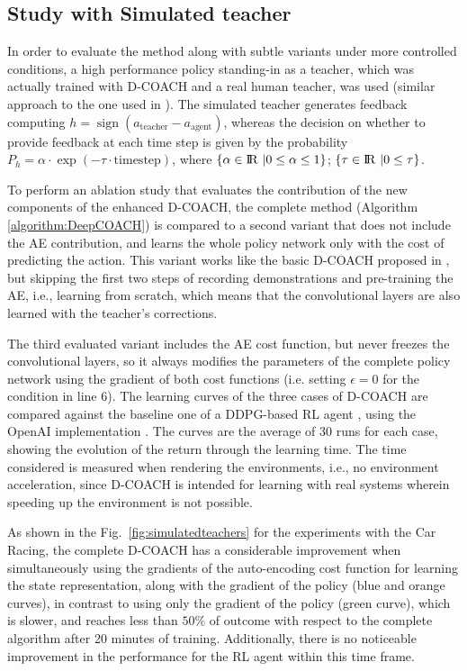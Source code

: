 \subsection{Study with Simulated teacher}
In order to evaluate the method along with subtle variants under more controlled conditions, a high performance policy standing-in as a teacher, which was actually trained with D-COACH and a real human teacher, was used (similar approach to the one used in  \cite{Celemin2018AnInteractive}). The simulated teacher generates feedback computing $h = \operatorname{sign}(a_\mathrm{teacher} - a_\mathrm{agent})$, whereas the decision on whether to provide feedback at each time step is given by the probability $P_{h} = \alpha \cdot\exp(-\tau\cdot \mathrm{timestep})$, where $\{\alpha \in {\rm I\!R}\ | 0 \le \alpha \le 1\}$; $\{\tau \in {\rm I\!R}\ | 0 \le \tau\}$.

To perform an ablation study that evaluates the contribution of the new components of the enhanced D-COACH, the complete method (Algorithm \ref{algorithm:DeepCOACH}) is compared to a second variant that does not include the AE contribution, and learns the whole policy network only with the cost of predicting the action. This variant  works like the basic D-COACH proposed in \cite{perez2018interactive}, but skipping the first two steps of recording demonstrations and pre-training the AE, i.e., learning from scratch, which means that the convolutional layers are also learned with the teacher's corrections.

The third evaluated variant includes the AE cost function, but never freezes the convolutional layers, so it always modifies the parameters of the complete policy network using the gradient of both cost functions (i.e. setting $\epsilon=0$ for the condition in line 6). The learning curves of the three cases of D-COACH are compared against the baseline one of a DDPG-based RL agent \cite{Lillicrap2015}, using the OpenAI implementation \cite{baselines}. The curves are the average of 30 runs for each case, showing the evolution of the return through the learning time. The time considered is measured when rendering the environments, i.e., no environment acceleration, since D-COACH is intended for learning with real systems wherein speeding up the environment is not possible.

As shown in the Fig.~\ref{fig:simulatedteachers} for the experiments with the Car Racing, the complete D-COACH has a considerable improvement when simultaneously using the gradients of the auto-encoding cost function for learning the state representation, along with the gradient of the policy  (blue and orange curves), in contrast to using only the gradient of the policy (green curve), which is slower, and reaches less than $50\%$ of outcome with respect to the complete algorithm after 20 minutes of training. Additionally, there is no noticeable improvement in the performance for the RL agent within this time frame.

